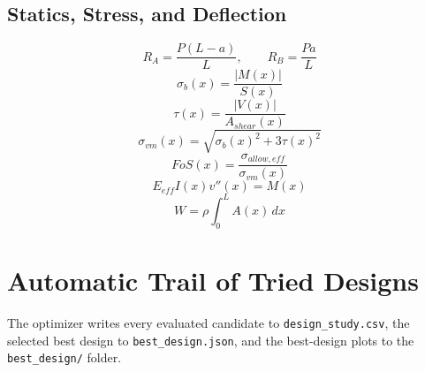 \documentclass[11pt]{article}
\begin{document}
\subsection*{Statics, Stress, and Deflection}
\[
R_A=\frac{P(L-a)}{L}, \qquad R_B=\frac{Pa}{L}
\]
\[
\sigma_b(x)=\frac{|M(x)|}{S(x)}
\]
\[
\tau(x)=\frac{|V(x)|}{A_{shear}(x)}
\]
\[
\sigma_{vm}(x)=\sqrt{\sigma_b(x)^2+3\tau(x)^2}
\]
\[
FoS(x)=\frac{\sigma_{allow,eff}}{\sigma_{vm}(x)}
\]
\[
E_{eff}I(x)v''(x)=M(x)
\]
\[
W=\rho\int_0^L A(x)\,dx
\]

\section*{Automatic Trail of Tried Designs}
The optimizer writes every evaluated candidate to \texttt{design\_study.csv}, the selected best design to \texttt{best\_design.json}, and the best-design plots to the \texttt{best\_design/} folder.
\end{document}
